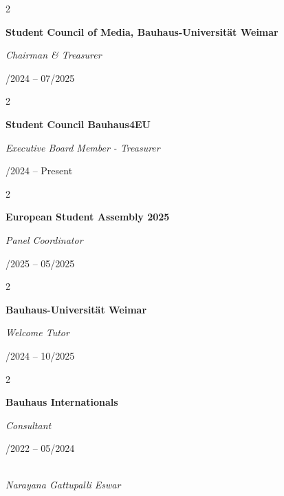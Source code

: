 \documentclass[10pt, a4paper]{article}
\newenvironment{twocolentry}[2][]{
    \onecolentry
    \def\secondColumn{#2}
    \setcolumnwidth{\fill, 4.5 cm}
    \begin{paracol}{2}
}{
    \switchcolumn \raggedleft \secondColumn
    \end{paracol}
    \endonecolentry
}
\begin{document}
\begin{twocolentry}{07/2024 -- 07/2025}
    \textbf{Student Council of Media, Bauhaus-Universität Weimar}

    \textit{Chairman \& Treasurer}
\end{twocolentry}

\vspace{0.10 cm}

\begin{twocolentry}{06/2024 -- Present}
    \textbf{Student Council Bauhaus4EU}

    \textit{Executive Board Member - Treasurer}
\end{twocolentry}

\vspace{0.10 cm}

\begin{twocolentry}{02/2025 -- 05/2025}
    \textbf{European Student Assembly 2025}

    \textit{Panel Coordinator}
\end{twocolentry}

\vspace{0.10 cm}

\begin{twocolentry}{10/2024 -- 10/2025}
    \textbf{Bauhaus-Universität Weimar}

    \textit{Welcome Tutor}
\end{twocolentry}

\vspace{0.10 cm}

\begin{twocolentry}{09/2022 -- 05/2024}
    \textbf{Bauhaus Internationals}

    \textit{Consultant}
\end{twocolentry}

\vspace{0.5cm}
\\
{\small\itshape\color{gray} Narayana Gattupalli Eswar}
\end{document}
